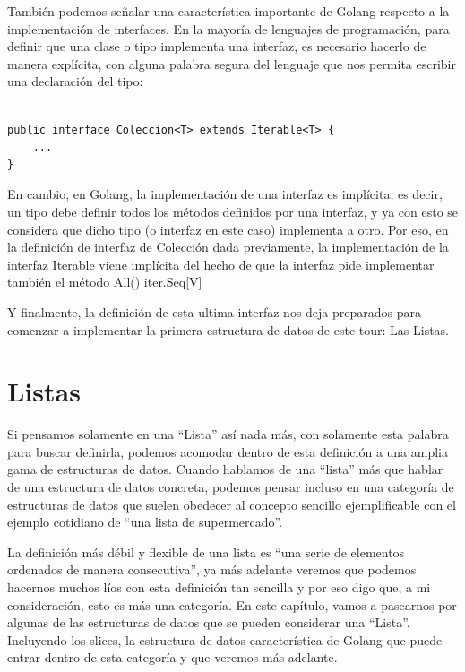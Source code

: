 \documentclass[11pt]{article}
\begin{document}
También podemos señalar una característica importante de Golang respecto a la implementación de interfaces. En la mayoría de lenguajes de programación, para definir que una clase o tipo implementa una interfaz, es necesario hacerlo de manera explícita, con alguna palabra segura del lenguaje que nos permita escribir una declaración del tipo:

\begin{verbatim}

public interface Coleccion<T> extends Iterable<T> {
    ...
}

\end{verbatim}

En cambio, en Golang, la implementación de una interfaz es implícita; es decir, un tipo debe definir todos los métodos definidos por una interfaz, y ya con esto se considera que dicho tipo (o interfaz en este caso) implementa a otro. Por eso, en la definición de interfaz de Colección dada previamente, la implementación de la interfaz Iterable viene implícita del hecho de que la interfaz pide implementar también el método All() iter.Seq[V]

Y finalmente, la definición de esta ultima interfaz nos deja preparados para comenzar a implementar la primera estructura de datos de este tour: Las Listas.
\section{Listas}
\label{sec:orga207efe}

Si pensamos solamente en una ``Lista'' así nada más, con solamente esta palabra para buscar definirla, podemos acomodar dentro de esta definición a una amplia gama de estructuras de datos. Cuando hablamos de una ``lista'' más que hablar de una estructura de datos concreta, podemos pensar incluso en una categoría de estructuras de datos que suelen obedecer al concepto sencillo ejemplificable con el ejemplo cotidiano de ``una lista de supermercado''.

La definición más débil y flexible de una lista es ``una serie de elementos ordenados de manera consecutiva'', ya más adelante veremos que podemos hacernos muchos líos con esta definición tan sencilla y por eso digo que, a mi consideración, esto es más una categoría. En este capítulo, vamos a pasearnos por algunas de las estructuras de datos que se pueden considerar una ``Lista''. Incluyendo los slices, la estructura de datos característica de Golang que puede entrar dentro de esta categoría y que veremos más adelante.
\end{document}
